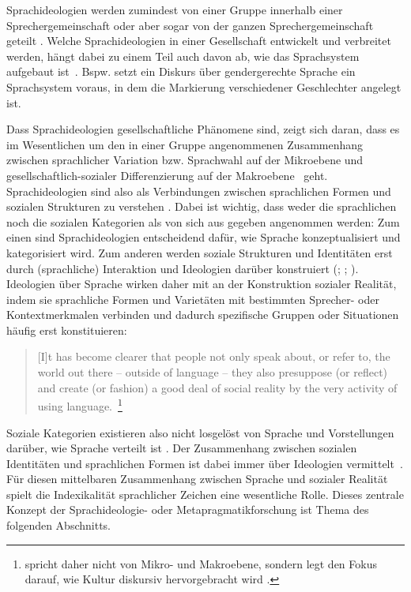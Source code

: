 Sprachideologien werden zumindest von einer Gruppe innerhalb einer Sprechergemeinschaft oder aber sogar von der ganzen Sprechergemeinschaft geteilt \citep[s.][125]{Silverstein1998}. 
Welche Sprachideologien in einer Gesellschaft entwickelt und verbreitet werden, h{\"a}ngt dabei zu einem Teil auch davon ab, wie das Sprachsystem aufgebaut ist~\citep[s.][194]{Silverstein1979}. 
Bspw. setzt ein Diskurs über gendergerechte Sprache ein Sprachsystem voraus, in dem die Markierung verschiedener Geschlechter angelegt ist. 

Dass Sprachideologien gesellschaftliche Phänomene sind, zeigt sich daran, dass es im Wesentlichen um den in einer Gruppe angenommenen \glqq Zusammenhang zwischen sprachlicher Variation bzw. Sprachwahl auf der Mikroebene und gesellschaftlich\hyp sozialer Differenzierung auf der Makroebene\grqq{}~\citep[202]{Konig2015} geht. 
Sprachideologien sind also als Verbindungen zwischen sprachlichen Formen und sozialen Strukturen zu verstehen \citep[s.][55]{Woolard1994}. 
Dabei ist wichtig, dass weder die sprachlichen noch die sozialen Kategorien als von sich aus gegeben angenommen werden:
Zum einen sind Sprachideologien entscheidend dafür, wie Sprache konzeptualisiert und kategorisiert wird. 
Zum anderen werden soziale Strukturen und Identit{\"a}ten erst durch (sprachliche) Interaktion und Ideologien darüber konstruiert (\citealp[s.][289]{Ochs.1993}; \citeyear[407]{Ochs1996}; \citealp[70]{Eckert.2016}). 
Ideologien über Sprache wirken daher mit an der Konstruktion sozialer Realität, indem sie sprachliche Formen und Varietäten mit bestimmten Sprecher- oder Kontextmerkmalen verbinden und dadurch spezifische Gruppen oder Situationen häufig erst konstituieren: 
\begin{quote}[I]t has become clearer that people not only speak about, or refer to, the world {\glq}out there{\grq} -- outside of language -- they also presuppose (or reflect) and create (or fashion) a good deal of social reality by the very activity of using language.~\citep[194]{Silverstein1979}\footnote{\citeauthor{Silverstein1979} spricht daher nicht von Mikro- und Makroebene, sondern legt den Fokus darauf, wie Kultur diskursiv hervorgebracht wird \citep[s. etwa][]{Silverstein.2013}.}\end{quote}
Soziale Kategorien existieren also nicht losgelöst von Sprache und Vorstellungen darüber, wie Sprache verteilt ist \citep[s.][81--82]{Cameron.1990}. 
Der Zusammenhang zwischen sozialen Identit{\"a}ten und sprachlichen Formen ist dabei immer über Ideologien vermittelt~\citep[s.][288]{Ochs.1993}. 
Für diesen mittelbaren Zusammenhang zwischen Sprache und sozialer Realität spielt die Indexikalität sprachlicher Zeichen eine wesentliche Rolle. Dieses zentrale Konzept der Sprachideologie- oder Metapragmatikforschung ist Thema des folgenden Abschnitts. 
